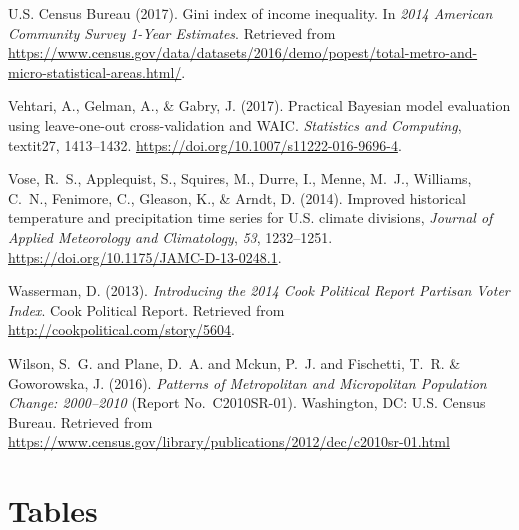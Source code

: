 \documentclass[draft,linenumbers]{agujournal}
\begin{document}
\begin{thebibliography}{33}
  {U.S. Census Bureau} (2017).
  Gini index of income inequality.
  In \textit{2014 American Community Survey 1-Year Estimates}.
  Retrieved from
  \url{https://www.census.gov/data/datasets/2016/demo/popest/total-metro-and-micro-statistical-areas.html/}.

  Vehtari, A., Gelman, A., \& Gabry, J. (2017).
  Practical {Bayesian} model evaluation using leave-one-out cross-validation and {WAIC}.
  \textit{Statistics and Computing}, textit{27}, 1413--1432.
  \url{https://doi.org/10.1007/s11222-016-9696-4}.

  Vose, R.~S., Applequist, S., Squires, M., Durre, I., Menne, M.~J., Williams, C.~N.,
  Fenimore, C., Gleason, K., \& Arndt, D. (2014).
  Improved historical temperature and precipitation time series for {U}.{S}.
  climate divisions,
  \textit{Journal of  Applied Meteorology and Climatology}, \textit{53}, 1232--1251.
  \url{https://doi.org/10.1175/JAMC-D-13-0248.1}.

  Wasserman, D. (2013).
  \textit{Introducing the 2014 {C}ook {P}olitical {R}eport {P}artisan {V}oter
  {I}ndex}.
  Cook Political Report.
  Retrieved from
  \url{http://cookpolitical.com/story/5604}.

  Wilson, S.~G. and Plane, D.~A. and Mckun, P.~J. and Fischetti, T.~R. \&
  Goworowska, J. (2016).
  \textit{Patterns of Metropolitan and Micropolitan Population Change: 2000--2010\/}
  (Report No.~C2010SR-01).
  Washington, DC:  U.S. Census Bureau.
  Retrieved from
  \url{https://www.census.gov/library/publications/2012/dec/c2010sr-01.html}

\end{thebibliography}

%
%
\clearpage
\section*{Tables}
\end{document}
